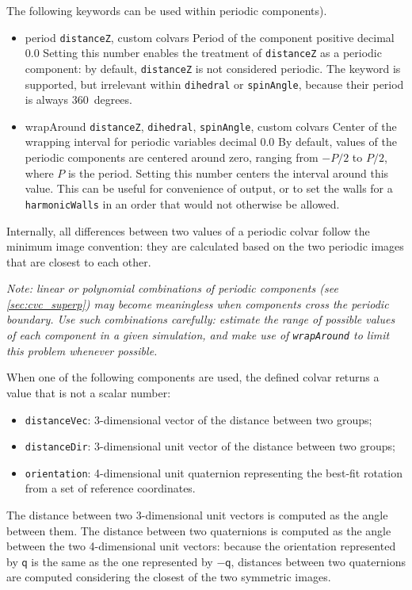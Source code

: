 The following keywords can be used within periodic components).

\begin{itemize}
\item %
  \keydef
    {period}{%
    \texttt{distanceZ}, custom colvars}{%
    Period of the component}{%
    positive decimal}{%
    0.0}{%
    Setting this number enables the treatment of \texttt{distanceZ} as
    a periodic component: by default, \texttt{distanceZ} is not
    considered periodic.  The keyword is supported, but irrelevant
    within \texttt{dihedral} or \texttt{spinAngle}, because their
    period is always 360~degrees.}

\item %
  \keydef
    {wrapAround}{%
    \texttt{distanceZ}, \texttt{dihedral}, \texttt{spinAngle}, custom colvars}{%
    Center of the wrapping interval for periodic variables}{%
    decimal}{%
    0.0}{%
    By default, values of the periodic components are centered around zero, ranging from $-P/2$ to $P/2$, where $P$ is the period.
    Setting this number centers the interval around this value.
    This can be useful for convenience of output, or to set the walls for a \texttt{harmonicWalls} in an order that would not otherwise be allowed.}
\end{itemize}

Internally, all differences between two values of a periodic colvar
follow the minimum image convention: they are calculated based on
the two periodic images that are closest to each other.

\emph{Note: linear or polynomial combinations of periodic components (see \ref{sec:cvc_superp}) may become meaningless when components cross the periodic boundary.  Use such combinations carefully: estimate the range of possible values of each component in a given simulation, and make use of \texttt{wrapAround} to limit this problem whenever possible.}



When one of the following components are used, the defined colvar returns a value that is not a scalar number:
\begin{itemize}
\item \texttt{distanceVec}: 3-dimensional vector of the distance
  between two groups;
\item \texttt{distanceDir}: 3-dimensional unit vector of the distance
  between two groups;
\item \texttt{orientation}: 4-dimensional unit quaternion representing
  the best-fit rotation from a set of reference coordinates.
\end{itemize}
The distance between two 3-dimensional unit vectors is computed as the
angle between them.  The distance between two quaternions is computed
as the angle between the two 4-dimensional unit vectors: because the
orientation represented by $\mathsf{q}$ is the same as the one
represented by $-\mathsf{q}$, distances between two quaternions are
computed considering the closest of the two symmetric images.

